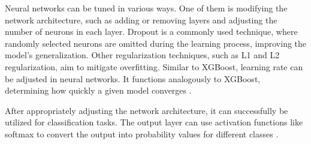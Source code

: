 Neural networks can be tuned in various ways. One of them is modifying the network architecture, such as adding or removing layers and adjusting the number of neurons in each layer. Dropout is a commonly used technique, where randomly selected neurons are omitted during the learning process, improving the model's generalization. Other regularization techniques, such as L1 and L2 regularization, aim to mitigate overfitting. Similar to XGBoost, learning rate can be adjusted in neural networks. It functions analogously to XGBoost, determining how quickly a given model converges \autocite{wager2013dropout, dropout2013}.

After appropriately adjusting the network architecture, it can successfully be utilized for classification tasks. The output layer can use activation functions like softmax to convert the output into probability values for different classes \autocite{raschka2019python}.


